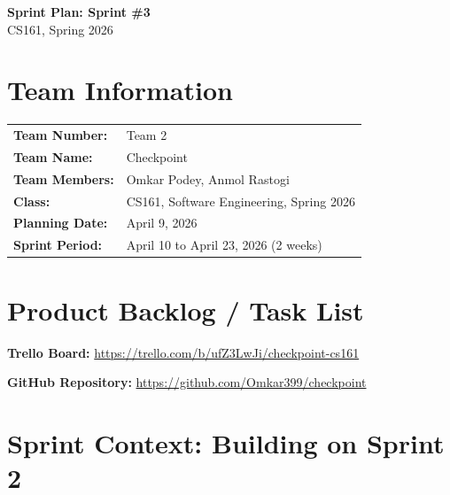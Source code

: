 \documentclass[11pt]{article}
\begin{document}
\begin{center}
    {\LARGE \textbf{Sprint Plan: Sprint \#3}} \\[6pt]
    {\large CS161, Spring 2026}
\end{center}

\vspace{0.5em}

\section{Team Information}

\begin{tabularx}{\textwidth}{@{}lX@{}}
    \textbf{Team Number:}          & Team 2 \\
    \textbf{Team Name:}            & Checkpoint \\
    \textbf{Team Members:}         & Omkar Podey, Anmol Rastogi \\
    \textbf{Class:}                & CS161, Software Engineering, Spring 2026 \\
    \textbf{Planning Date:}        & April 9, 2026 \\
    \textbf{Sprint Period:}        & April 10 to April 23, 2026 (2 weeks) \\
\end{tabularx}

\section{Product Backlog / Task List}

\textbf{Trello Board:} \url{https://trello.com/b/ufZ3LwJi/checkpoint-cs161}

\textbf{GitHub Repository:} \url{https://github.com/Omkar399/checkpoint}

\section{Sprint Context: Building on Sprint 2}
\end{document}
